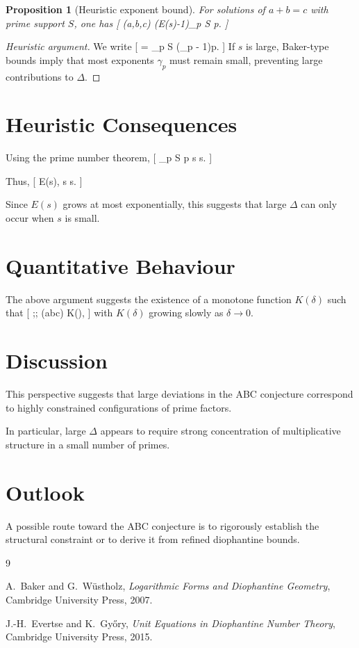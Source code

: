 \documentclass[11pt]{article}
\newtheorem{proposition}{Proposition}
\begin{document}
	\begin{proposition}[Heuristic exponent bound]
		For solutions of $a+b=c$ with prime support $S$, one has
		[
		\Delta(a,b,c) \le (E(s)-1)\sum_{p \in S} \log p.
		]
	\end{proposition}
	
	\begin{proof}[Heuristic argument]
		We write
		[
		\Delta = \sum_{p \in S} (\gamma_p - 1)\log p.
		]
		If $s$ is large, Baker-type bounds imply that most exponents $\gamma_p$
		must remain small, preventing large contributions to $\Delta$.
	\end{proof}
	
	\section{Heuristic Consequences}
	
	Using the prime number theorem,
	[
	\sum_{p \in S} \log p \gtrsim s \log s.
	]
	
	Thus,
	[
	\Delta \lesssim E(s), s \log s.
	]
	
	Since $E(s)$ grows at most exponentially, this suggests that large $\Delta$
	can only occur when $s$ is small.
	
	\section{Quantitative Behaviour}
	
	The above argument suggests the existence of a monotone function $K(\delta)$ such that
	[
	\Delta \ge \delta ;\Rightarrow; \omega(abc) \le K(\delta),
	]
	with $K(\delta)$ growing slowly as $\delta \to 0$.
	
	\section{Discussion}
	
	This perspective suggests that large deviations in the ABC conjecture
	correspond to highly constrained configurations of prime factors.
	
	In particular, large $\Delta$ appears to require strong concentration
	of multiplicative structure in a small number of primes.
	
	\section{Outlook}
	
	A possible route toward the ABC conjecture is to rigorously establish
	the structural constraint or to derive it from refined diophantine bounds.
	
	\begin{thebibliography}{9}
		
		A.~Baker and G.~Wüstholz,
		\textit{Logarithmic Forms and Diophantine Geometry},
		Cambridge University Press, 2007.
		
		J.-H.~Evertse and K.~Győry,
		\textit{Unit Equations in Diophantine Number Theory},
		Cambridge University Press, 2015.
		
	\end{thebibliography}
	
\end{document}
